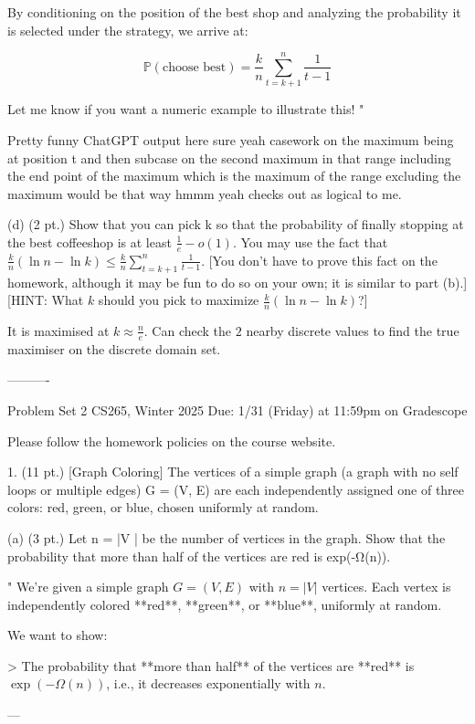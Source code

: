 By conditioning on the position of the best shop and analyzing the probability it is selected under the strategy, we arrive at:

\[
\boxed{\mathbb{P}(\text{choose best}) = \frac{k}{n} \sum_{t = k+1}^n \frac{1}{t - 1}}
\]

Let me know if you want a numeric example to illustrate this!
"

Pretty funny ChatGPT output here sure yeah casework on the maximum being at position t and then subcase on the second maximum in that range including the end point of the maximum which is the maximum of the range excluding the maximum would be that way hmmm yeah checks out as logical to me.

(d) (2 pt.) Show that you can pick k so that the probability of finally stopping at the best coffeeshop is at least $\frac{1}{e} - o(1)$. You may use the fact that $\frac{k}{n} (\ln n - \ln k) \le \frac{k}{n} \sum_{t=k+1}^n \frac{1}{t-1}$. [You don't have to prove this fact on the homework, although it may be fun to do so on your own; it is similar to part (b).] [HINT: What $k$ should you pick to maximize $\frac{k}{n} (\ln n - \ln k)$?]

It is maximised at $k \approx \frac{n}{e}$. Can check the $2$ nearby discrete values to find the true maximiser on the discrete domain set.

----------

Problem Set 2 CS265, Winter 2025
Due: 1/31 (Friday) at 11:59pm on Gradescope

Please follow the homework policies on the course website.

1. (11 pt.) [Graph Coloring]
The vertices of a simple graph (a graph with no self loops or multiple edges) G = (V, E) are each independently assigned one of three colors: red, green, or blue, chosen uniformly at random.

(a) (3 pt.) Let n = |V | be the number of vertices in the graph. Show that the probability that more than half of the vertices are red is exp(-Ω(n)).

"
We're given a simple graph \( G = (V, E) \) with \( n = |V| \) vertices. Each vertex is independently colored **red**, **green**, or **blue**, uniformly at random.

We want to show:

> The probability that **more than half** of the vertices are **red** is \( \exp(-\Omega(n)) \), i.e., it decreases exponentially with \( n \).

---

